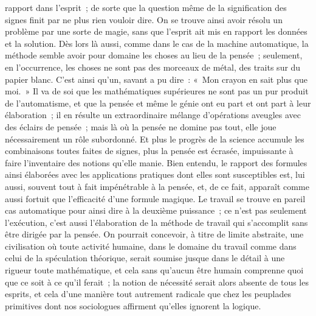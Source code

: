 \documentclass[french,twoside]{book} %
\begin{document}
rapport dans l'esprit ; de sorte que la question même de la signification des signes finit par ne plus rien vouloir dire. On se trouve ainsi avoir résolu un problème par une sorte de magie, sans que l'esprit ait mis en rapport les données et la solution. Dès lors là aussi, comme dans le cas de la machine automatique, la méthode semble avoir pour domaine les choses au lieu de la pensée ; seulement, en l'occurrence, les choses ne sont pas des morceaux de métal, des traits sur du papier blanc. C'est ainsi qu'un, savant a pu dire : « Mon crayon en sait plus que moi. » Il va de soi que les mathématiques supérieures ne sont pas un pur produit de l'automatisme, et que la pensée et même le génie ont eu part et ont part à leur élaboration ; il en résulte un extraordinaire mélange d'opérations aveugles avec des éclairs de pensée ; mais là où la pensée ne domine pas tout, elle joue nécessairement un rôle subordonné. Et plus le progrès de la science accumule les combinaisons toutes faites de signes, plus la pensée est écrasée, impuissante à faire l'inventaire des notions qu'elle manie. Bien entendu, le rapport des formules ainsi élaborées avec les applications pratiques dont elles sont susceptibles est, lui aussi, souvent tout à fait impénétrable à la pensée, et, de ce fait, apparaît comme aussi fortuit que l'efficacité d'une formule magique. Le travail se trouve en pareil cas automatique pour ainsi dire à la deuxième puissance ; ce n'est pas seulement l'exécution, c'est aussi l'élaboration de la méthode de travail qui s'accomplit sans être dirigée par la pensée. On pourrait concevoir, à titre de limite abstraite, une civilisation où toute activité humaine, dans le domaine du travail comme dans celui de la spéculation théorique, serait soumise jusque dans le détail à une rigueur toute mathématique, et cela sans qu'aucun être humain comprenne quoi que ce soit à ce qu'il ferait ; la notion de nécessité serait alors absente de tous les esprits, et cela d'une manière tout autrement radicale que chez les peuplades primitives dont nos sociologues affirment qu'elles ignorent la logique.\par
\end{document}
